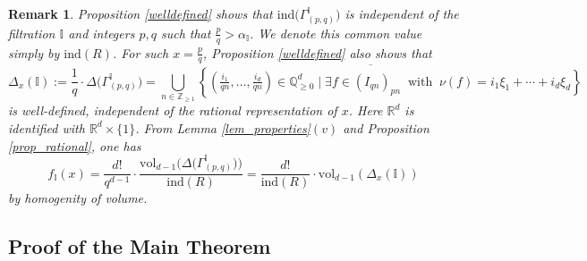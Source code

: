 \documentclass[12pt,a4paper]{amsart}
\theoremstyle{plain}
\newtheorem{remark}[theorem]{Remark}
\theoremstyle{definition}
\numberwithin{equation}{theorem}
\begin{document}
\begin{remark}\label{suffices}
Proposition \ref{welldefined} shows that $\mathrm{ind}\big(\Gamma^{\mathbb{I}}_{(p,q)}\big)$ is independent of the filtration $\mathbb{I}$ and integers $p,q$ such that $\tfrac{p}{q}>\alpha_{\mathbb{I}}$. We denote this common value simply by $\mathrm{ind}(R)$. For such $x=\frac{p}{q}$, Proposition \ref{welldefined} also shows that $$\Delta_x(\mathbb{I}) := \frac{1}{q}\cdot\Delta\big(\Gamma^{\mathbb{I}}_{(p,q)}\big) = \overline{\bigcup_{n\in\mathbb{Z}_{\geq 1}}\left\{\left(\tfrac{i_1}{qn},\ldots,\tfrac{i_d}{qn}\right)\in\mathbb{Q}_{\geq 0}^d \mid \exists f\in {\left(I_{qn}\right)}_{pn}\;\;\text{with}\;\;\nu(f)=i_1\xi_1+\cdots+i_d\xi_d\right\}}$$ is well-defined, independent of the rational representation of $x$. Here $\mathbb{R}^d$ is identified with $\mathbb{R}^d\times \{1\}$. From  Lemma \ref{lem_properties}\;$(v)$ and Proposition \ref{prop_rational}, one has
\begin{equation*}
 f_{\mathbb{I}}(x) = \dfrac{d!}{q^{d-1}}\cdot\dfrac{\mathrm{vol}_{d-1}\big(\Delta\big(\Gamma^{\mathbb{I}}_{(p,q)}\big)\big)}{\mathrm{ind}(R)} = \frac{d!}{\mathrm{ind}(R)}\cdot \mathrm{vol}_{d-1}\left(\Delta_x(\mathbb{I})\right)
\end{equation*}
by homogenity of volume.
\end{remark}

\subsection{Proof of the Main Theorem}
\end{document}
